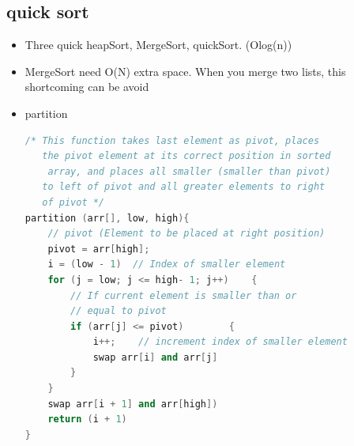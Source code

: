 \documentclass[a4paper,11pt,twoside]{book}
\begin{document}
\subsection{quick  sort}
\begin{itemize}
\item Three quick heapSort, MergeSort, quickSort. (Olog(n))
\item MergeSort need O(N) extra space. When you merge two lists, this shortcoming can be avoid

\item partition 
\begin{lstlisting}[frame=single, language=c++]
/* This function takes last element as pivot, places
   the pivot element at its correct position in sorted
    array, and places all smaller (smaller than pivot)
   to left of pivot and all greater elements to right
   of pivot */
partition (arr[], low, high){
    // pivot (Element to be placed at right position)
    pivot = arr[high];   
    i = (low - 1)  // Index of smaller element
    for (j = low; j <= high- 1; j++)    {
        // If current element is smaller than or
        // equal to pivot
        if (arr[j] <= pivot)        {
            i++;    // increment index of smaller element
            swap arr[i] and arr[j]
        }
    }
    swap arr[i + 1] and arr[high])
    return (i + 1)
}
\end{lstlisting}


\end{itemize}
\end{document}
